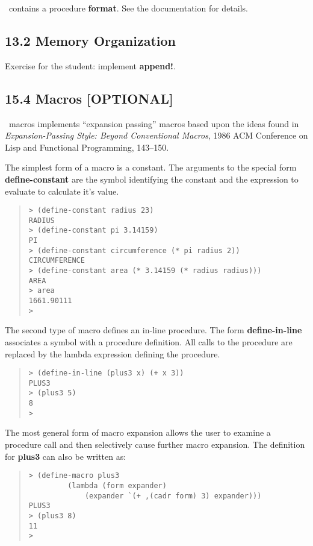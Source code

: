 \documentclass[10pt]{article}
\begin{document}
\StoC\ contains a procedure \textbf{format}.  See the documentation for
details.

\subsection*{13.2 Memory Organization}

Exercise for the student:  implement \textbf{append!}.

\subsection*{15.4 Macros [OPTIONAL]}

\StoC\ macros implements ``expansion passing'' macros based upon the
ideas found in \emph{Expansion-Passing Style: Beyond Conventional Macros},
1986 ACM Conference on Lisp and Functional Programming, 143--150.

The simplest form of a macro is a constant.  The arguments to the
special form \textbf{define-constant} are the symbol identifying the
constant and the expression to evaluate to calculate it's value.

\begin{quote}
\begin{verbatim}
> (define-constant radius 23)
RADIUS
> (define-constant pi 3.14159)
PI
> (define-constant circumference (* pi radius 2))
CIRCUMFERENCE
> (define-constant area (* 3.14159 (* radius radius)))
AREA
> area
1661.90111
>
\end{verbatim}
\end{quote}

The second type of macro defines an in-line procedure.  The form
\textbf{define-in-line} associates a symbol with a procedure definition.
All calls to the procedure are replaced by the lambda expression
defining the procedure.

\begin{quote}
\begin{verbatim}
> (define-in-line (plus3 x) (+ x 3))
PLUS3
> (plus3 5)
8
>
\end{verbatim}
\end{quote}

The most general form of macro expansion allows the user to
examine a procedure call and then selectively cause further
macro expansion.  The definition for \textbf{plus3} can also be written
as:

\begin{quote}
\begin{verbatim}
> (define-macro plus3
	     (lambda (form expander)
		     (expander `(+ ,(cadr form) 3) expander)))
PLUS3
> (plus3 8)
11
>				
\end{verbatim}
\end{quote}
\end{document}
